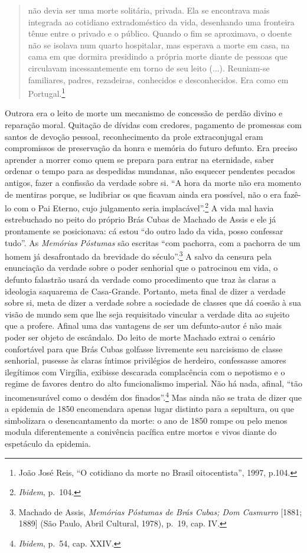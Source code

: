 \begin{quote}
não devia ser uma morte solitária, privada. Ela se encontrava mais
integrada ao cotidiano extradoméstico da vida, desenhando uma fronteira
tênue entre o privado e o público. Quando o fim se aproximava, o doente
não se isolava num quarto hospitalar, mas esperava a morte em casa, na
cama em que dormira presidindo a própria morte diante de pessoas que
circulavam incessantemente em torno de seu leito (...). Reuniam-se
familiares, padres, rezadeiras, conhecidos e desconhecidos. Era como em
Portugal.\footnote{João José Reis, ``O cotidiano da morte no Brasil
  oitocentista'', 1997, p.104.}
\end{quote}

Outrora era o leito de morte um mecanismo de concessão de perdão divino
e reparação moral. Quitação de dívidas com credores, pagamento de
promessas com santos de devoção pessoal, reconhecimento da prole
extraconjugal eram compromissos de preservação da honra e memória do
futuro defunto. Era preciso aprender a morrer como quem se prepara para
entrar na eternidade, saber ordenar o tempo para as despedidas mundanas,
não esquecer pendentes pecados antigos, fazer a confissão da verdade
sobre si. ``A hora da morte não era momento de mentiras porque, se
ludibriar os que ficavam ainda era possível, não o era fazê-lo com o Pai
Eterno, cujo julgamento seria implacável''.\footnote{\emph{Ibidem},
  p.~104.} A vida mal havia estrebuchado no peito do próprio Brás Cubas
de Machado de Assis e ele já prontamente se posicionava: cá estou ``do
outro lado da vida, posso confessar tudo''. As \emph{Memórias Póstumas}
são escritas ``com pachorra, com a pachorra de um homem já desafrontado
da brevidade do século''.\footnote{Machado de Assis, \emph{Memórias
  Póstumas de Brás Cubas; Dom Casmurro} {[}1881; 1889{]} (São Paulo,
  Abril Cultural, 1978), p.~19, cap. IV.} A salvo da censura pela
enunciação da verdade sobre o poder senhorial que o patrocinou em vida,
o defunto falastrão usará da verdade como procedimento que traz às
claras a ideologia saquarema de Casa-Grande. Portanto, meta final de
dizer a verdade sobre si, meta de dizer a verdade sobre a sociedade de
classes que dá coesão à sua visão de mundo sem que lhe seja requisitado
vincular a verdade dita ao sujeito que a profere. Afinal uma das
vantagens de ser um defunto-autor é não mais poder ser objeto de
escândalo. Do leito de morte Machado extrai o cenário confortável para
que Brás Cubas golfasse livremente seu narcisismo de classe senhorial,
pusesse às claras íntimos privilégios de herdeiro, confessasse amores
ilegítimos com Virgília, exibisse descarada complacência com o nepotismo
e o regime de favores dentro do alto funcionalismo imperial. Não há
nada, afinal, ``tão incomensurável como o desdém dos
finados''.\footnote{\emph{Ibidem}, p.~54, cap. XXIV.} Mas ainda não se
trata de dizer que a epidemia de 1850 encomendara apenas lugar distinto
para a sepultura, ou que simbolizara o desencantamento da morte: o ano
de 1850 rompe ou pelo menos modula diferentemente a conivência pacífica
entre mortos e vivos diante do espetáculo da epidemia.

